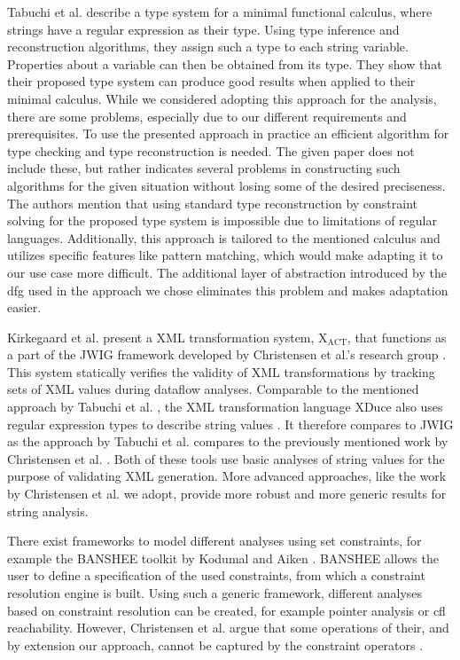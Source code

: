 Tabuchi et al. \cite{regex_types} describe a type system for a minimal functional calculus, where strings have a regular expression as their type. Using type inference and reconstruction algorithms, they assign such a type to each string variable. Properties about a variable can then be obtained from its type.
They show that their proposed type system can produce good results when applied to their minimal calculus. While we considered adopting this approach for the analysis, there are some problems, especially due to our different requirements and prerequisites. 
To use the presented approach in practice an efficient algorithm for type checking and type reconstruction is needed. 
The given paper does not include these, but rather indicates several problems in constructing such algorithms for the given situation without losing some of the desired preciseness.
The authors mention that using standard type reconstruction by constraint solving for the proposed type system is impossible due to limitations of regular languages.
Additionally, this approach is tailored to the mentioned calculus and utilizes specific features like pattern matching, which would make adapting it to our use case more difficult.
The additional layer of abstraction introduced by the \ac{dfg} used in the approach we chose eliminates this problem and makes adaptation easier.

Kirkegaard et al. present a XML transformation system, $\text{X}_{\text{ACT}}$, that functions as a part of the JWIG framework developed by Christensen et al.'s research group \cite{xact}. This system statically verifies the validity of XML transformations by tracking sets of XML values during dataflow analyses.
Comparable to the mentioned approach by Tabuchi et al. \cite{regex_types}, the XML transformation language XDuce also uses regular expression types to describe string values \cite{xduce}. It therefore compares to JWIG as the approach by Tabuchi et al. compares to the previously mentioned work by Christensen et al. \cite{brics}. 
Both of these tools use basic analyses of string values for the purpose of validating XML generation. More advanced approaches, like the work by Christensen et al. we adopt, provide more robust and more generic results for string analysis.

There exist frameworks to model different analyses using set constraints, for example the BANSHEE toolkit by Kodumal and Aiken \cite{banshee}. BANSHEE allows the user to define a specification of the used constraints, from which a constraint resolution engine is built. Using such a generic framework, different analyses based on constraint resolution can be created, for example pointer analysis or \ac{cfl} reachability. However, Christensen et al. argue that some operations of their, and by extension our approach, cannot be captured by the constraint operators \cite{brics}.

